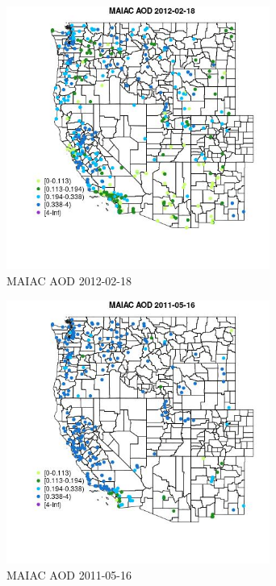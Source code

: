 \begin{figure} 
\centering  
\includegraphics[width=0.77\textwidth]{Code_Outputs/Report_ML_input_PM25_Step4_part_f_de_duplicated_aves_prioritize_24hr_obswNAs_MapObsMAIAC_AOD2012-02-18.jpg} 
\caption{\label{fig:Report_ML_input_PM25_Step4_part_f_de_duplicated_aves_prioritize_24hr_obswNAsMapObsMAIAC_AOD2012-02-18}MAIAC AOD 2012-02-18} 
\end{figure} 
 

\begin{figure} 
\centering  
\includegraphics[width=0.77\textwidth]{Code_Outputs/Report_ML_input_PM25_Step4_part_f_de_duplicated_aves_prioritize_24hr_obswNAs_MapObsMAIAC_AOD2011-05-16.jpg} 
\caption{\label{fig:Report_ML_input_PM25_Step4_part_f_de_duplicated_aves_prioritize_24hr_obswNAsMapObsMAIAC_AOD2011-05-16}MAIAC AOD 2011-05-16} 
\end{figure} 
 

